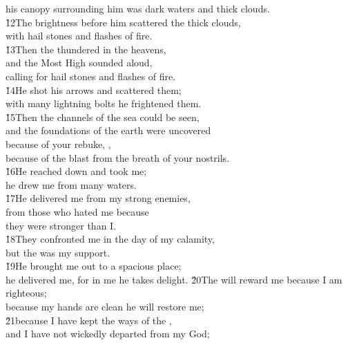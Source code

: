 \begin{poetry}
\poemll    his canopy surrounding him was dark waters and thick clouds. \\
\poeml \v{12}The brightness before him scattered the thick clouds, \\
\poemll    with hail stones and flashes of fire. \\
\poeml \v{13}Then the  thundered in the heavens, \\
\poemll    and the Most High sounded aloud, \\
\poemlll       calling for hail stones and flashes of fire. \\
\poeml \v{14}He shot his arrows and scattered them; \\
\poemll    with many lightning bolts he frightened them. \\
\poeml \v{15}Then the channels of the sea could be seen, \\
\poemll    and the foundations of the earth were uncovered \\
\poeml because of your rebuke, , \\
\poemll    because of the blast from the breath of your nostrils. \\
\poeml \v{16}He reached down and took me; \\
\poemll    he drew me from many waters. \\
\poeml \v{17}He delivered me from my strong enemies, \\
\poemll    from those who hated me because \\
\poemlll       they were stronger than I. \\
\poeml \v{18}They confronted me in the day of my calamity, \\
\poemll    but the  was my support. \\
\poeml \v{19}He brought me out to a spacious place; \\
\poemll    he delivered me, for in me he takes delight.
\poeml \v{20}The  will reward me because I am righteous; \\
\poemll    because my hands are clean he will restore me; \\
\poeml \v{21}because I have kept the ways of the , \\
\poemll    and I have not wickedly departed from my God; \\

\end{poetry}
